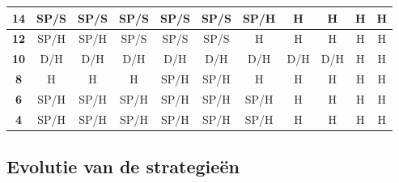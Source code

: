 \documentclass[conference]{IEEEtran}
\begin{document}
\begin{table}[htbp]
\begin{tabular}{|c|c|c|c|c|c|c|c|c|c|c|}
\textbf{14} & \cellcolor[HTML]{F8FF00}SP/S & \cellcolor[HTML]{F8FF00}SP/S & \cellcolor[HTML]{F8FF00}SP/S & \cellcolor[HTML]{F8FF00}SP/S & \cellcolor[HTML]{F8FF00}SP/S & \cellcolor[HTML]{F8FF00}SP/H & \cellcolor[HTML]{FE0000}H & \cellcolor[HTML]{FE0000}H & \cellcolor[HTML]{FE0000}H & \cellcolor[HTML]{FE0000}H \\ \hline
\textbf{12} & \cellcolor[HTML]{F8FF00}SP/H & \cellcolor[HTML]{F8FF00}SP/H & \cellcolor[HTML]{F8FF00}SP/S & \cellcolor[HTML]{F8FF00}SP/S & \cellcolor[HTML]{F8FF00}SP/S & \cellcolor[HTML]{FE0000}H & \cellcolor[HTML]{FE0000}H & \cellcolor[HTML]{FE0000}H & \cellcolor[HTML]{FE0000}H & \cellcolor[HTML]{FE0000}H \\ \hline
\textbf{10} & \cellcolor[HTML]{FFC702}D/H & \cellcolor[HTML]{FFC702}D/H & \cellcolor[HTML]{FFC702}D/H & \cellcolor[HTML]{FFC702}D/H & \cellcolor[HTML]{FFC702}D/H & \cellcolor[HTML]{FFC702}D/H & \cellcolor[HTML]{FFC702}D/H & \cellcolor[HTML]{FFC702}D/H & \cellcolor[HTML]{FE0000}H & \cellcolor[HTML]{FE0000}H \\ \hline
\textbf{8} & \cellcolor[HTML]{FE0000}H & \cellcolor[HTML]{FE0000}H & \cellcolor[HTML]{FE0000}H & \cellcolor[HTML]{F8FF00}SP/H & \cellcolor[HTML]{F8FF00}SP/H & \cellcolor[HTML]{FE0000}H & \cellcolor[HTML]{FE0000}H & \cellcolor[HTML]{FE0000}H & \cellcolor[HTML]{FE0000}H & \cellcolor[HTML]{FE0000}H \\ \hline
\textbf{6} & \cellcolor[HTML]{F8FF00}SP/H & \cellcolor[HTML]{F8FF00}SP/H & \cellcolor[HTML]{F8FF00}SP/H & \cellcolor[HTML]{F8FF00}SP/H & \cellcolor[HTML]{F8FF00}SP/H & \cellcolor[HTML]{F8FF00}SP/H & \cellcolor[HTML]{FE0000}H & \cellcolor[HTML]{FE0000}H & \cellcolor[HTML]{FE0000}H & \cellcolor[HTML]{FE0000}H \\ \hline
\textbf{4} & \cellcolor[HTML]{F8FF00}SP/H & \cellcolor[HTML]{F8FF00}SP/H & \cellcolor[HTML]{F8FF00}SP/H & \cellcolor[HTML]{F8FF00}SP/H & \cellcolor[HTML]{F8FF00}SP/H & \cellcolor[HTML]{F8FF00}SP/H & \cellcolor[HTML]{FE0000}H & \cellcolor[HTML]{FE0000}H & \cellcolor[HTML]{FE0000}H & \cellcolor[HTML]{FE0000}H \\ \hline
\end{tabular}
\end{table}








\subsection{Evolutie van de strategie\"{e}n}
\end{document}
